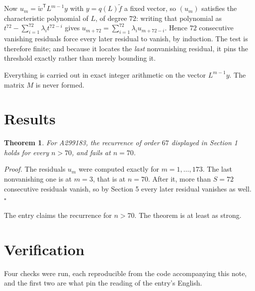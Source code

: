 \documentclass[11pt]{article}
\newtheorem{theorem}{Theorem}
\theoremstyle{definition}
\begin{document}
Now $u_m = \tilde w^{\mathsf T} L^{m-1} y$ with $y = q(L)\tilde f$ a fixed vector, so $(u_m)$ satisfies the characteristic polynomial of $L$, of degree $72$: writing that polynomial as $t^{72} - \sum_{i=1}^{72} \lambda_i t^{72-i}$ gives $u_{m+72} = \sum_{i=1}^{72} \lambda_i u_{m+72-i}$. Hence $72$ consecutive vanishing residuals force every later residual to vanish, by induction. The test is therefore finite; and because it locates the {\itshape last} nonvanishing residual, it pins the threshold exactly rather than merely bounding it.

Everything is carried out in exact integer arithmetic on the vector $L^{m-1}y$. The matrix $M$ is never formed.

\section{Results}

\begin{theorem} For A299183, the recurrence of order $67$ displayed in Section 1 holds for every $n > 70$, and fails at $n = 70$.\end{theorem}

{\itshape Proof.} The residuals $u_m$ were computed exactly for $m = 1,\dots,173$. The last nonvanishing one is at $m = 3$, that is at $n = 70$. After it, more than $S = 72$ consecutive residuals vanish, so by Section 5 every later residual vanishes as well. $\square$

The entry claims the recurrence for $n > 70$. The theorem is at least as strong.

\section{Verification}

Four checks were run, each reproducible from the code accompanying this note, and the first two are what pin the reading of the entry's English.
\end{document}
